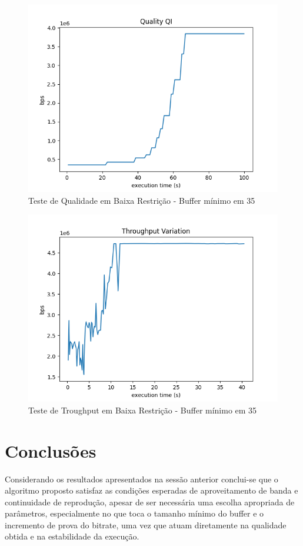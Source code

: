 \documentclass[10pt,twocolumn,letterpaper]{article}
\begin{document}
\begin{figure}
	\centering
	\includegraphics[width=\linewidth]{playback_quality_qi35.png}
	\caption{Teste de Qualidade em Baixa Restrição - Buffer mínimo em 35}
	\label{fig:9}
\end{figure}

\begin{figure}
	\centering
	\includegraphics[width=\linewidth]{throughput35.png}
	\caption{Teste de Troughput em Baixa Restrição - Buffer mínimo em 35}
	\label{fig:10}
\end{figure}
\section{Conclusões}
Considerando os resultados apresentados na sessão anterior conclui-se que o algoritmo proposto satisfaz as condições esperadas de aproveitamento de banda e continuidade de reprodução, apesar de ser necessária uma escolha apropriada de parâmetros, especialmente no que toca o tamanho mínimo do buffer e o incremento de prova do bitrate, uma vez que atuam diretamente na qualidade obtida e na estabilidade da execução. 
\end{document}
